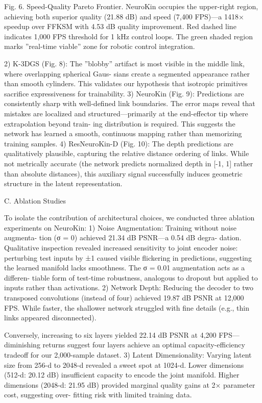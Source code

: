 \documentclass[10pt,twocolumn,letterpaper]{article}
\begin{document}
Fig. 6. Speed-Quality Pareto Frontier. NeuroKin occupies the upper-right region, achieving both superior quality (21.88 dB) and speed (7,400 FPS)—a 1418× speedup over FFKSM with 4.53 dB quality improvement. Red dashed line indicates 1,000 FPS threshold for 1 kHz control loops. The green shaded region marks ”real-time viable” zone for robotic control integration.

2) K-3DGS (Fig. 8): The ”blobby” artifact is most visible in the middle link, where overlapping spherical Gaus- sians create a segmented appearance rather than smooth cylinders. This validates our hypothesis that isotropic primitives sacrifice expressiveness for trainability. 3) NeuroKin (Fig. 9): Predictions are consistently sharp with well-defined link boundaries. The error maps reveal that mistakes are localized and structured—primarily at the end-effector tip where extrapolation beyond train- ing distribution is required. This suggests the network has learned a smooth, continuous mapping rather than memorizing training samples. 4) ResNeuroKin-D (Fig. 10): The depth predictions are qualitatively plausible, capturing the relative distance ordering of links. While not metrically accurate (the network predicts normalized depth in [-1, 1] rather than absolute distances), this auxiliary signal successfully induces geometric structure in the latent representation.

C. Ablation Studies

To isolate the contribution of architectural choices, we conducted three ablation experiments on NeuroKin: 1) Noise Augmentation: Training without noise augmenta- tion (σ = 0) achieved 21.34 dB PSNR—a 0.54 dB degra- dation. Qualitative inspection revealed increased sensitivity to joint encoder noise: perturbing test inputs by ±1 caused visible flickering in predictions, suggesting the learned manifold lacks smoothness. The σ = 0.01 augmentation acts as a differen- tiable form of test-time robustness, analogous to dropout but applied to inputs rather than activations. 2) Network Depth: Reducing the decoder to two transposed convolutions (instead of four) achieved 19.87 dB PSNR at 12,000 FPS. While faster, the shallower network struggled with fine details (e.g., thin links appeared disconnected).

Conversely, increasing to six layers yielded 22.14 dB PSNR at 4,200 FPS—diminishing returns suggest four layers achieve an optimal capacity-efficiency tradeoff for our 2,000-sample dataset. 3) Latent Dimensionality: Varying latent size from 256-d to 2048-d revealed a sweet spot at 1024-d. Lower dimensions (512-d: 20.12 dB) insufficient capacity to encode the joint manifold. Higher dimensions (2048-d: 21.95 dB) provided marginal quality gains at 2× parameter cost, suggesting over- fitting risk with limited training data.
\end{document}

